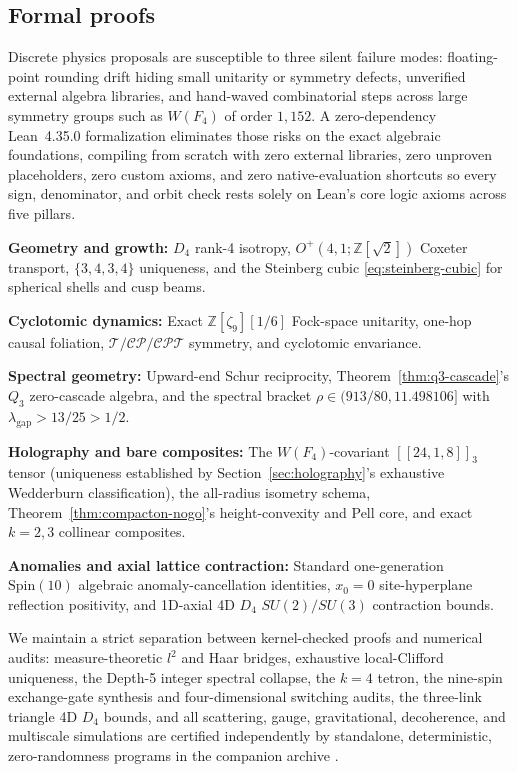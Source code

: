\subsection{Formal proofs}

Discrete physics proposals are susceptible to three silent failure modes: floating-point rounding drift hiding small
unitarity or symmetry defects, unverified external algebra libraries, and hand-waved combinatorial steps across large
symmetry groups such as $W(F_4)$ of order $1{,}152$. A zero-dependency Lean~4.35.0 formalization
\cite{demoura2021lean4, cluesurf2026repo} eliminates those risks on the exact algebraic foundations, compiling from
scratch with zero external libraries, zero unproven placeholders, zero custom axioms, and zero native-evaluation
shortcuts so every sign, denominator, and orbit check rests solely on Lean's core logic axioms across five pillars.

\textbf{Geometry and growth:} $D_4$ rank-4 isotropy, $O^+(4,1; \mathbb{Z}[\sqrt{2}])$ Coxeter transport, $\{3,4,3,4\}$
uniqueness, and the Steinberg cubic \eqref{eq:steinberg-cubic} for spherical shells and cusp beams.

\textbf{Cyclotomic dynamics:} Exact $\mathbb{Z}[\zeta_9][1/6]$ Fock-space unitarity, one-hop causal foliation,
$\mathcal{T}/\mathcal{CP}/\mathcal{CPT}$ symmetry, and cyclotomic envariance.

\textbf{Spectral geometry:} Upward-end Schur reciprocity, Theorem~\ref{thm:q3-cascade}'s $Q_3$ zero-cascade algebra, and
the spectral bracket $\rho \in (913/80, 11.498106]$ with $\lambda_{\mathrm{gap}} > 13/25 > 1/2$.

\textbf{Holography and bare composites:} The $W(F_4)$-covariant $[[24, 1, 8]]_3$ tensor (uniqueness established by
Section~\ref{sec:holography}'s exhaustive Wedderburn classification), the all-radius isometry schema,
Theorem~\ref{thm:compacton-nogo}'s height-convexity and Pell core, and exact $k = 2, 3$ collinear composites.

\textbf{Anomalies and axial lattice contraction:} Standard one-generation $\mathrm{Spin}(10)$ algebraic
anomaly-cancellation identities, $x_0 = 0$ site-hyperplane reflection positivity, and 1D-axial 4D $D_4$ $SU(2)/SU(3)$
contraction bounds.

We maintain a strict separation between kernel-checked proofs and numerical audits: measure-theoretic $l^2$ and Haar
bridges, exhaustive local-Clifford uniqueness, the Depth-5 integer spectral collapse, the $k = 4$ tetron, the nine-spin
exchange-gate synthesis and four-dimensional switching audits, the three-link triangle 4D $D_4$ bounds, and all
scattering, gauge, gravitational, decoherence, and multiscale simulations are certified independently by standalone,
deterministic, zero-randomness programs in the companion archive \cite{cluesurf2026repo}.

